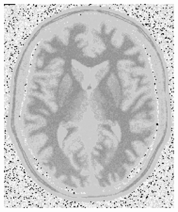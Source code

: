 \documentclass[11pt,twocolumn,twoside]{opticajnl}
\begin{document}
\begin{figure}[h]
\begin{subfigure}[h]{0.24\linewidth}
            \includegraphics[width=\textwidth]{Figuras/sustraction_EQ.png}
        \end{subfigure}
                \caption{Diferencia entre la imagen original y la imagen ecualizada.}
                \label{fig:EQ_sustraction}
         \begin{subfigure}[h]{0.24\linewidth}
            \centering

\end{subfigure}
\end{figure}
\end{document}
